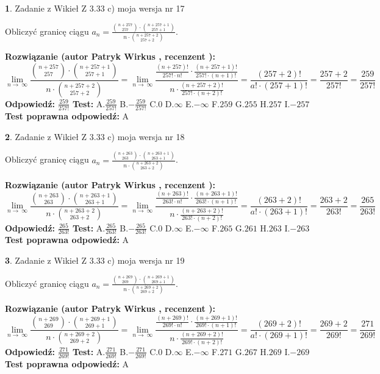 \documentclass[12pt, a4paper]{article}
\theoremstyle{definition} %
\newtheorem{zad}{}
\newcommand{\zadStart}[1]{\begin{zad}#1\newline}
\newcommand{\zadStop}{\end{zad}}
\newcommand{\rozwStart}[2]{\noindent \textbf{Rozwiązanie (autor #1 , recenzent #2): }\newline}
\newcommand{\rozwStop}{\newline}
\newcommand{\odpStart}{\noindent \textbf{Odpowiedź:}\newline}
\newcommand{\odpStop}{\newline}
\newcommand{\testStart}{\noindent \textbf{Test:}\newline}
\newcommand{\testStop}{\newline}
\newcommand{\kluczStart}{\noindent \textbf{Test poprawna odpowiedź:}\newline}
\newcommand{\kluczStop}{\newline}
\begin{document}
\zadStart{Zadanie z Wikieł Z 3.33 c) moja wersja nr 17}

Obliczyć granicę ciągu $a_{n}=\frac{{n+257\choose257}\cdot{n+257+1\choose257+1}}{n\cdot{n+257+2\choose257+2}}$.
\zadStop
\rozwStart{Patryk Wirkus}{}
$$\lim\limits_{n\to\ \infty}\frac{{n+257\choose257}\cdot{n+257+1\choose257+1}}{n\cdot{n+257+2\choose257+2}} = \lim\limits_{n\to\ \infty}\frac{\frac{(n+257)!}{257! \cdot n!}\cdot \frac{(n+257+1)!}{257! \cdot (n+1)!}}{n\cdot \frac{(n+257+2)!}{257! \cdot (n+2)!}} = \frac{(257+2)!}{a!\cdot (257+1)!} = \frac{257+2}{257!} = \frac{259}{257!}$$
\rozwStop
\odpStart
$\frac{259}{257!}$
\odpStop
\testStart
A.$\frac{259}{257!}$ B.$-\frac{259}{257!}$ C.$0$ D.$\infty$ E.$-\infty$
F.$259$ G.$255$
H.$257$
I.$-257$
\testStop
\kluczStart
A
\kluczStop



\zadStart{Zadanie z Wikieł Z 3.33 c) moja wersja nr 18}

Obliczyć granicę ciągu $a_{n}=\frac{{n+263\choose263}\cdot{n+263+1\choose263+1}}{n\cdot{n+263+2\choose263+2}}$.
\zadStop
\rozwStart{Patryk Wirkus}{}
$$\lim\limits_{n\to\ \infty}\frac{{n+263\choose263}\cdot{n+263+1\choose263+1}}{n\cdot{n+263+2\choose263+2}} = \lim\limits_{n\to\ \infty}\frac{\frac{(n+263)!}{263! \cdot n!}\cdot \frac{(n+263+1)!}{263! \cdot (n+1)!}}{n\cdot \frac{(n+263+2)!}{263! \cdot (n+2)!}} = \frac{(263+2)!}{a!\cdot (263+1)!} = \frac{263+2}{263!} = \frac{265}{263!}$$
\rozwStop
\odpStart
$\frac{265}{263!}$
\odpStop
\testStart
A.$\frac{265}{263!}$ B.$-\frac{265}{263!}$ C.$0$ D.$\infty$ E.$-\infty$
F.$265$ G.$261$
H.$263$
I.$-263$
\testStop
\kluczStart
A
\kluczStop



\zadStart{Zadanie z Wikieł Z 3.33 c) moja wersja nr 19}

Obliczyć granicę ciągu $a_{n}=\frac{{n+269\choose269}\cdot{n+269+1\choose269+1}}{n\cdot{n+269+2\choose269+2}}$.
\zadStop
\rozwStart{Patryk Wirkus}{}
$$\lim\limits_{n\to\ \infty}\frac{{n+269\choose269}\cdot{n+269+1\choose269+1}}{n\cdot{n+269+2\choose269+2}} = \lim\limits_{n\to\ \infty}\frac{\frac{(n+269)!}{269! \cdot n!}\cdot \frac{(n+269+1)!}{269! \cdot (n+1)!}}{n\cdot \frac{(n+269+2)!}{269! \cdot (n+2)!}} = \frac{(269+2)!}{a!\cdot (269+1)!} = \frac{269+2}{269!} = \frac{271}{269!}$$
\rozwStop
\odpStart
$\frac{271}{269!}$
\odpStop
\testStart
A.$\frac{271}{269!}$ B.$-\frac{271}{269!}$ C.$0$ D.$\infty$ E.$-\infty$
F.$271$ G.$267$
H.$269$
I.$-269$
\testStop
\kluczStart
A
\kluczStop
\end{document}
